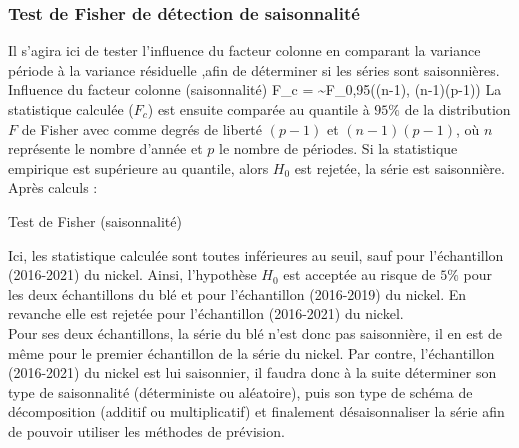 \subsubsection{Test de Fisher de détection de saisonnalité}
Il s'agira ici de tester l'influence du facteur colonne en comparant la variance période à la variance résiduelle
,afin de déterminer si les séries sont saisonnières.
    {Influence du facteur colonne (saisonnalité)}
    {F_{c} =  \sim F_{0,95}((n-1), (n-1)(p-1))}
La statistique calculée ($F_{c}$) est ensuite comparée au quantile à $95\%$ de la distribution $F$ de
Fisher avec comme degrés de liberté $(p-1)$ et $(n-1)(p-1)$, où $n$ représente le nombre d'année
et $p$ le nombre de périodes. Si la statistique empirique est supérieure au quantile,
alors $ H_{0} $ est rejetée, la série est saisonnière. Après calculs :
\begin{table}[H]
    \centering
    \caption{Test de Fisher (saisonnalité)}
    \sffamily
    
\end{table}
Ici, les statistique calculée sont toutes inférieures au seuil, sauf pour l'échantillon (2016-2021)
du nickel.  Ainsi, l'hypothèse $H_{0}$ est acceptée au risque de $5\%$ pour les deux échantillons du blé
et pour l'échantillon (2016-2019) du nickel. En revanche elle est rejetée pour l'échantillon (2016-2021) du nickel.\\[11pt]
Pour ses deux échantillons, la série du blé n'est donc pas saisonnière, il en est de même pour le premier échantillon de la série du nickel. 
Par contre, l'échantillon (2016-2021) du nickel est lui saisonnier, il faudra donc à la suite 
déterminer son type de saisonnalité (déterministe ou aléatoire), puis son type de schéma de décomposition
(additif ou multiplicatif) et finalement désaisonnaliser la série afin de pouvoir utiliser les méthodes de prévision.
